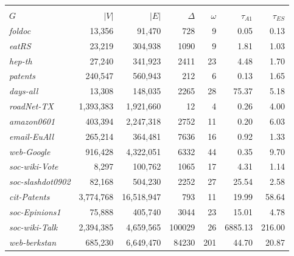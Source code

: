 \begin{table}[!hbt]
\begin{tabular}{lrrrr|rr}
	&		&		&		&		&		&		\\
$G$	&	$\left|V\right|$	&	$\left|E\right|$	&	$\Delta$	&	$\omega$	&	$\tau_{A1}$	&	$\tau_{ES}$ \cite{sea}  	\\ \hline \hline
{\it foldoc}	&	13,356	&	91,470	&	728	&	9	&	0.05	&	0.13	\\
{\it eatRS}	&	23,219	&	304,938	&	1090	&	9	&	1.81	&	1.03	\\
{\it hep-th}	&	27,240	&	341,923	&	2411	&	23	&	4.48	&	1.70	\\
{\it patents}	&	240,547	&	560,943	&	212	&	6	&	0.13	&	1.65	\\
{\it days-all}	&	13,308	&	148,035	&	2265	&	28	&	75.37	&	5.18	\\
{\it roadNet-TX}	&	1,393,383	&	1,921,660	&	12	&	4	&	0.26	&	4.00	\\
{\it amazon0601}	&	403,394	&	2,247,318	&	2752	&	11	&	0.20	&	6.03	\\
{\it email-EuAll}	&	265,214	&	364,481	&	7636	&	16	&	0.92	&	1.33	\\
{\it web-Google}	&	916,428	&	4,322,051	&	6332	&	44	&	0.35	&	9.70	\\
{\it soc-wiki-Vote}	&	8,297	&	100,762	&	1065	&	17	&	4.31	&	1.14	\\
{\it soc-slashdot0902}	&	82,168	&	504,230	&	2252	&	27	&	25.54	&	2.58	\\
{\it cit-Patents}	&	3,774,768	&	16,518,947	&	793	&	11	&	19.99	&	58.64	\\
{\it soc-Epinions1}	&	75,888	&	405,740	&	3044	&	23	&	15.01	&	4.78	\\
{\it soc-wiki-Talk}	&	2,394,385	&	4,659,565	&	100029	&	26	&	6885.13	&	216.00	\\
{\it web-berkstan}	&	685,230	&	6,649,470	&	84230	&	201	&	44.70	&	20.87	\\
\bottomrule\bottomrule
\end{tabular}
\end{table}

